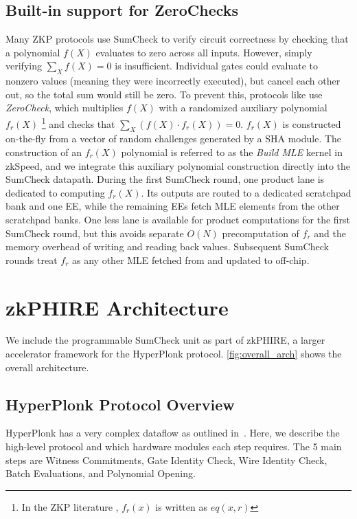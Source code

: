 \subsection{Built-in support for ZeroChecks}
Many ZKP protocols use SumCheck to verify circuit correctness by checking that a polynomial $f(X)$ evaluates to zero across all inputs. However, simply verifying $\sum_X f(X) = 0$ is insufficient. Individual gates could evaluate to nonzero values (meaning they were incorrectly executed), but cancel each other out, so the total sum would still be zero. To prevent this, protocols like \cite{spartan, orion, strawman} use \textit{ZeroCheck}, which multiplies $f(X)$ with a randomized auxiliary polynomial $f_r(X)$
\footnote{In the ZKP literature \cite{spartan, hyperplonk, jolt}, $f_r(x)$ is written as $eq(x, r)$}
and checks that $\sum_X (f(X) \cdot f_r(X)) = 0$.
$f_r(X)$ is constructed on-the-fly from a vector of random challenges generated by a SHA module.
The construction of an $f_r(X)$ polynomial is referred to as the \textit{Build MLE} kernel in zkSpeed, and we integrate this auxiliary polynomial construction directly into the SumCheck datapath. During the first SumCheck round, one product lane is dedicated to computing $f_r(X)$. Its outputs are routed to a dedicated scratchpad bank and one EE, while the remaining EEs fetch MLE elements from the other scratchpad banks.
One less lane is available for product computations for the first SumCheck round, but this avoids separate $O(N)$ precomputation of $f_r$ and the memory overhead of writing and reading back values.
Subsequent SumCheck rounds treat $f_r$ as any other MLE fetched from and updated to off-chip.


\section{zkPHIRE Architecture}
We include the programmable SumCheck unit as part of zkPHIRE, a larger accelerator framework for the HyperPlonk protocol. \autoref{fig:overall_arch} shows the overall architecture.


\subsection{HyperPlonk Protocol Overview}
HyperPlonk has a very complex dataflow as outlined in~\cite{zkspeed2025}. Here, we describe the high-level protocol and which hardware modules each step requires. The 5 main steps are Witness Commitments, Gate Identity Check, Wire Identity Check, Batch Evaluations, and Polynomial Opening. 

